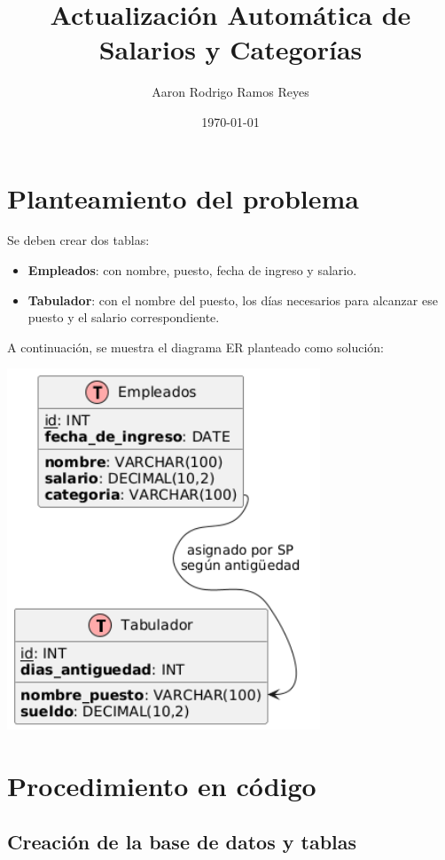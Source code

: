 \documentclass[12pt]{article}
\title{Actualización Automática de Salarios y Categorías}
\author{Aaron Rodrigo Ramos Reyes}
\date{\today}
\begin{document}
\maketitle

\section*{Planteamiento del problema}

Se deben crear dos tablas:
\begin{itemize}
  \item \textbf{Empleados}: con nombre, puesto, fecha de ingreso y salario.
  \item \textbf{Tabulador}: con el nombre del puesto, los días necesarios para alcanzar ese puesto y el salario correspondiente.
\end{itemize}

A continuación, se muestra el diagrama ER planteado como solución:

\begin{center}
  \includegraphics[width=0.7\textwidth]{DiagramaER.png}
\end{center}

\section*{Procedimiento en código}

\subsection*{Creación de la base de datos y tablas}
\end{document}
